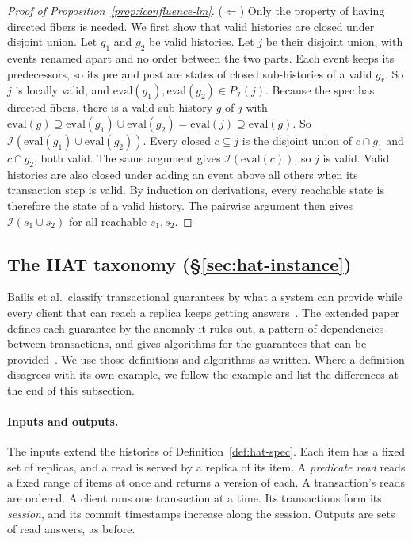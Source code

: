 \begin{proof}[Proof of Proposition~\ref{prop:iconfluence-lm}]
($\Leftarrow$) Only the property of having directed fibers is needed.  We
first show that valid histories are closed under disjoint union.  Let $g_1$
and $g_2$ be valid histories.  Let $j$ be their disjoint union, with events
renamed apart and no order between the two parts.  Each event keeps its
predecessors, so its $\mathrm{pre}$ and $\mathrm{post}$ are states of closed
sub-histories of a valid $g_r$.  So $j$ is locally valid, and
$\mathrm{eval}(g_1),\mathrm{eval}(g_2)\in P_{\mathcal I}(j)$.  Because the
spec has directed fibers, there is a valid sub-history $g$ of $j$ with
$\mathrm{eval}(g)\supseteq\mathrm{eval}(g_1)\cup\mathrm{eval}(g_2)=\mathrm{eval}(j)\supseteq\mathrm{eval}(g)$.
So $\mathcal I(\mathrm{eval}(g_1)\cup\mathrm{eval}(g_2))$.  Every closed
$c\subseteq j$ is the disjoint union of $c\cap g_1$ and $c\cap g_2$, both
valid.  The same argument gives $\mathcal I(\mathrm{eval}(c))$, so $j$ is
valid.  Valid histories are also closed under adding an event above all
others when its transaction step is valid.  By induction on derivations, every
reachable state is therefore the state of a valid history.  The pairwise
argument then gives $\mathcal I(s_1\cup s_2)$ for all reachable $s_1,s_2$.
\end{proof}

\subsection{The HAT taxonomy (\S\ref{sec:hat-instance})}
\label{app:hat-taxonomy}

Bailis et al.\ classify transactional guarantees by what a system can provide
while every client that can reach a replica keeps getting
answers~\cite{bailis2013hat}.  The extended paper defines each guarantee by
the anomaly it rules out, a pattern of dependencies between transactions, and
gives algorithms for the guarantees that can be
provided~\cite{bailis2013hatextended}.  We use those definitions and
algorithms as written.  Where a definition disagrees with its own example, we
follow the example and list the differences at the end of this subsection.

\paragraph{Inputs and outputs.}
The inputs extend the histories of Definition~\ref{def:hat-spec}.  Each item
has a fixed set of replicas, and a read is served by a replica of its item.  A
\emph{predicate read} reads a fixed range of items at once and returns a
version of each.  A transaction's reads are ordered.  A client runs one
transaction at a time.  Its transactions form its \emph{session}, and its
commit timestamps increase along the session.  Outputs are sets of read
answers, as before.

